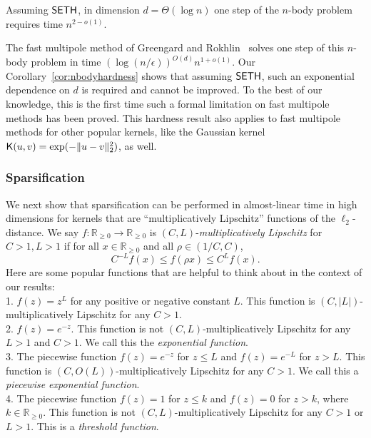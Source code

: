 \begin{corollary} \label{cor:nbodyhardness}
Assuming $\mathsf{SETH}$, in dimension $d = \Theta(\log n)$ one step of the $n$-body problem requires time $n^{2 - o(1)}$.
\end{corollary}

The fast multipole method of Greengard and Rokhlin~\cite{gr87, gr89} solves one step of this $n$-body problem in time $(\log(n/\epsilon))^{O(d)} n^{1+o(1)}$. Our Corollary~\ref{cor:nbodyhardness} shows that assuming $\mathsf{SETH}$, such an exponential dependence on $d$ is required and cannot be improved. To the best of our knowledge, this is the first time such a formal limitation on fast multipole methods has been proved. This hardness result also applies to fast multipole methods for other popular kernels, like the Gaussian kernel $\mathsf{K}(u,v) = \exp(-\|u - v\|_2^2)$, as well.





\subsubsection{Sparsification}

We next show that sparsification can be performed in almost-linear time in high dimensions for kernels that are ``multiplicatively Lipschitz'' functions of the $\ell_2$-distance. We say $f:\mathbb{R}_{\ge 0}\rightarrow \mathbb{R}_{\ge 0}$ is $(C,L)$-\emph{multiplicatively Lipschitz} for $C > 1, L > 1$ if for all $x\in \mathbb{R}_{\ge 0}$ and all $\rho\in (1/C,C)$,
$$C^{-L} f(x)\le f(\rho x)\le C^L f(x).$$
Here are some popular functions that are helpful to think about in the context of our results:\\
${}$\hspace{4mm}1. $f(z) = z^L$ for any positive or negative constant $L$. This function is $(C,|L|)$-multiplicatively Lipschitz for any $C > 1$. \\
${}$\hspace{4mm}2. $f(z) = e^{-z}$. This function is not $(C,L)$-multiplicatively Lipschitz for any $L > 1$ and $C > 1$. We call this the \emph{exponential function}.\\
${}$\hspace{4mm}3.  The piecewise function $f(z) = e^{-z}$ for $z\le L$ and $f(z) = e^{-L}$ for $z > L$. This function is $(C,O(L))$-multiplicatively Lipschitz for any $C > 1$. We call this a \emph{piecewise exponential function}. \\
${}$\hspace{4mm}4. The piecewise function $f(z) = 1$ for $z\le k$ and $f(z) = 0$ for $z > k$, where $k\in \mathbb{R}_{\ge 0}$. This function is not $(C,L)$-multiplicatively Lipschitz for any $C > 1$ or $L > 1$. This is a \emph{threshold function}.


